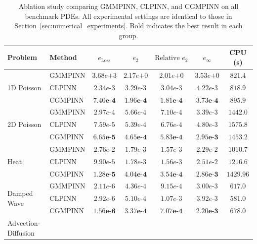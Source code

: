 \documentclass{article}
\theoremstyle{plain}
\theoremstyle{definition}
\theoremstyle{remark}
\begin{document}
\begin{table}[t]
	\centering
	\caption{Ablation study comparing GMMPINN, CLPINN, and CGMPINN on all benchmark PDEs. All experimental settings are identical to those in Section~\ref{sec:numerical_experiments}. Bold indicates the best result in each group.}
	\label{tab:ablation_all}
	\begin{tabular}{llccccc}
			\toprule
			Problem & Method & $e_{\text{Loss}}$ & $e_2$ & $\text{Relative } e_2$ & $e_\infty$ & CPU (s) \\
			\midrule
			\multirow{3}{*}{1D Poisson}
			& GMMPINN & $3.68e\text{+}3$ & $2.17e\text{+}0$ & $2.01e\text{+}0$ & $3.53e\text{+}0$ & $821.4$ \\
			& CLPINN  & $2.34e\text{-}3$ & $3.29e\text{-}3$ & $3.04e\text{-}3$ & $4.22e\text{-}3$ & $818.9$ \\
			& CGMPINN & $\mathbf{7.40e\text{-}4}$ & $\mathbf{1.96e\text{-}4}$ & $\mathbf{1.81e\text{-}4}$ & $\mathbf{3.73e\text{-}4}$ & $895.9$ \\
			\midrule
			\multirow{3}{*}{2D Poisson}
			& GMMPINN & $2.97e\text{-}4$ & $5.66e\text{-}4$ & $7.10e\text{-}4$ & $3.39e\text{-}3$ & $1442.0$ \\
			& CLPINN  & $7.59e\text{-}5$ & $5.39e\text{-}4$ & $6.76e\text{-}4$ & $4.80e\text{-}3$ & $1575.8$ \\
			& CGMPINN & $\mathbf{6.65e\text{-}5}$ & $\mathbf{4.65e\text{-}4}$ & $\mathbf{5.83e\text{-}4}$ & $\mathbf{2.95e\text{-}3}$ & $1453.2$ \\
			\midrule
			\multirow{3}{*}{Heat}
			& GMMPINN & $2.76e\text{-}2$ & $1.79e\text{-}3$ & $1.57e\text{-}3$ & $2.29e\text{-}2$ & $1010.7$ \\
			& CLPINN  & $9.90e\text{-}5$ & $1.78e\text{-}3$ & $1.56e\text{-}3$ & $2.51e\text{-}2$ & $1216.6$ \\
			& CGMPINN & $\mathbf{1.28e\text{-}5}$ & $\mathbf{4.04e\text{-}4}$ & $\mathbf{3.54e\text{-}4}$ & $\mathbf{2.86e\text{-}3}$ & $1429.96$ \\
			\midrule
			\multirow{3}{*}{Damped Wave}
			& GMMPINN & $2.11e\text{-}6$ & $4.36e\text{-}4$ & $9.15e\text{-}4$ & $3.00e\text{-}3$ & $617.0$ \\
			& CLPINN  & $2.92e\text{-}6$ & $5.10e\text{-}4$ & $1.07e\text{-}3$ & $3.92e\text{-}3$ & $581.0$ \\
			& CGMPINN & $\mathbf{1.56e\text{-}6}$ & $\mathbf{3.37e\text{-}4}$ & $\mathbf{7.07e\text{-}4}$ & $\mathbf{2.20e\text{-}3}$ & $678.0$ \\
			\midrule
			\multirow{3}{*}{Advection-Diffusion}

\end{tabular}
\end{table}
\end{document}
